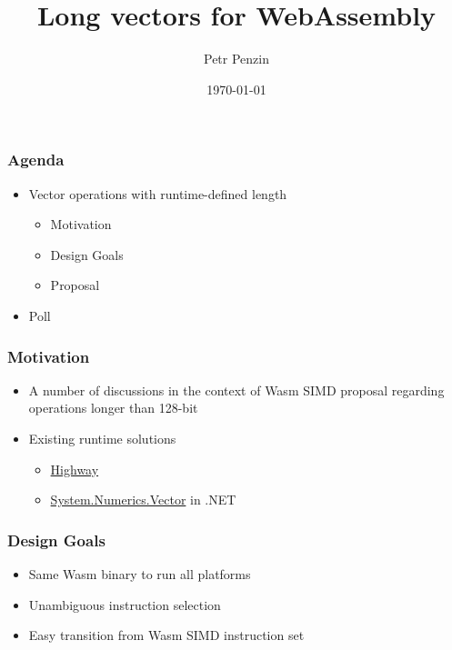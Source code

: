 \documentclass[t,aspectratio=169, xcolor={table}]{beamer}
\title{Long vectors for WebAssembly}
\author{Petr Penzin}
\institute{Intel Corporation}
\date{\today}
\begin{document}
\begin{frame}
  \titlepage
\end{frame}
\begin{frame}
\frametitle{Agenda}

  \begin{itemize}
  \item Vector operations with runtime-defined length
    \begin{itemize}
    \item Motivation
    \item Design Goals
    \item Proposal
    \end{itemize}
  \item Poll
  \end{itemize}

\end{frame}
\begin{frame}
\frametitle{Motivation}
  \begin{itemize}
  \item A number of discussions in the context of Wasm SIMD proposal regarding operations longer than 128-bit\footnotemark[1]\footnotemark[2]
  \item Existing runtime solutions
    \begin{itemize}
    \item \href{https://github.com/google/highway}{Highway}
    \item \href{https://docs.microsoft.com/en-us/dotnet/api/system.numerics.vector}{System.Numerics.Vector} in .NET
    \end{itemize}
  \end{itemize}
\end{frame}
\begin{frame}
\frametitle{Design Goals}
  \begin{itemize}
  \item Same Wasm binary to run all platforms
  \item Unambiguous instruction selection
  \item Easy transition from Wasm SIMD instruction set
  \end{itemize}
\end{frame}
\end{document}
